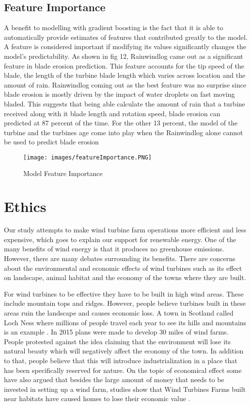 \documentclass[runningheads]{llncs}
\begin{document}
\subsection{Feature Importance}

A benefit to modelling with gradient boosting is the fact that it is able to automatically provide estimates of features that contributed greatly to the model. A feature is  considered important if modifying its values   significantly changes the model's predictability. As shown in fig 12, Rainwindlog came out as  a significant feature in blade erosion prediction. This feature accounts for the tip speed of the blade, the length of the turbine blade length  which varies across location and the amount of rain. Rainwindlog coming out as the best feature was no surprise since blade erosion is mostly driven by the impact of water droplets on fast moving bladed.  This suggests that being able calculate the amount of rain that a turbine received along with it blade length and rotation speed, blade erosion can predicted at 87 percent of the time. For the other 13 percent, the model of the turbine and the turbines age come into play when the Rainwindlog alone cannot be used to predict blade erosion


  \begin{figure}[H]
    \centering
    \texttt{[image: images/featureImportance.PNG]}
    \caption{Model Feature Importance}
    \label{fig:featImport}
\end{figure}

\section{Ethics} 
Our study attempts to make wind turbine farm operations more efficient and less expensive, which goes to explain our support for renewable energy. One of the many benefits of wind energy is that it produces no greenhouse emissions. However, there are many debates surrounding its benefits. There are concerns about the environmental and economic effects of wind turbines such as its effect on landscape, animal habitat and the economy of the towns where they are built\cite{Ethical}.

For wind turbines to be effective they have to be built in high wind areas. These include mountain tops and ridges. However, people believe turbines built in these areas ruin the landscape and causes economic loss. A town in Scotland called Loch Ness where millions of people travel each year to see its hills and mountains is an example \cite{LochNess}. In 2015 plans were made to develop 30 miles of wind farms. People protested against the idea claiming that the environment will lose its natural beauty which will negatively affect the economy of the town. In addition to that, people believe that this will introduce industrialization in a place that has been specifically reserved for nature. On the topic of economical effect some have also argued that besides the large amount of money that needs to be invested in setting up a wind farm, studies show that Wind Turbines Farms built near habitats have caused homes to lose their economic value \cite{Ethical}.
\end{document}
